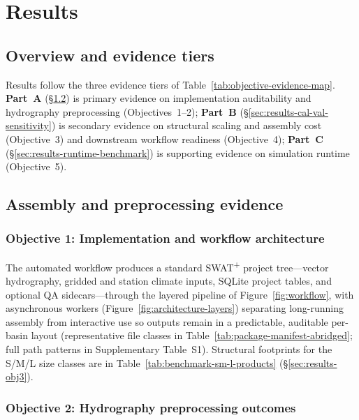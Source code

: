 \section{Results}

\subsection{Overview and evidence tiers}
\label{sec:results-overview}

Results follow the three evidence tiers of Table~\ref{tab:objective-evidence-map}.
\textbf{Part~A} (\S\ref{sec:results-assembly-preprocessing}) is primary evidence on implementation auditability and hydrography preprocessing (Objectives~1--2); \textbf{Part~B} (\S\ref{sec:results-cal-val-sensitivity}) is secondary evidence on structural scaling and assembly cost (Objective~3) and downstream workflow readiness (Objective~4); \textbf{Part~C} (\S\ref{sec:results-runtime-benchmark}) is supporting evidence on simulation runtime (Objective~5).

\subsection{Assembly and preprocessing evidence}
\label{sec:results-assembly-preprocessing}

\subsubsection{Objective 1: Implementation and workflow architecture}
\label{sec:results-obj1}

The automated workflow produces a standard SWAT\textsuperscript{+} project tree---vector hydrography, gridded and station climate inputs, SQLite project tables, and optional QA sidecars---through the layered pipeline of Figure~\ref{fig:workflow}, with asynchronous workers (Figure~\ref{fig:architecture-layers}) separating long-running assembly from interactive use so outputs remain in a predictable, auditable per-basin layout (representative file classes in Table~\ref{tab:package-manifest-abridged}; full path patterns in Supplementary Table~S1). Structural footprints for the S/M/L size classes are in Table~\ref{tab:benchmark-sm-l-products} (\S\ref{sec:results-obj3}).

\subsubsection{Objective 2: Hydrography preprocessing outcomes}
\label{sec:results-obj2}

